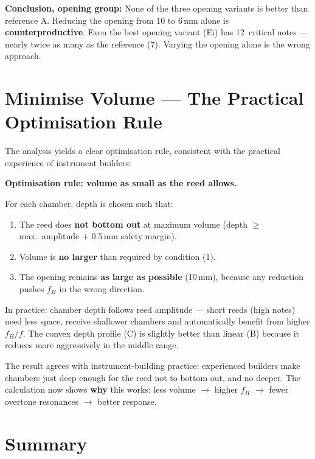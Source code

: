\documentclass[11pt,a4paper]{article}
\begin{document}
\begin{warnbox}
\textbf{Conclusion, opening group:} None of the three opening variants is better than reference A. Reducing the opening from 10 to 6\,mm alone is \textbf{counterproductive}. Even the best opening variant (Ei) has 12~critical notes --- nearly twice as many as the reference (7). Varying the opening alone is the wrong approach.
\end{warnbox}

\section{Minimise Volume --- The Practical Optimisation Rule}

The analysis yields a clear optimisation rule, consistent with the practical experience of instrument builders:

\begin{keybox}
\textbf{Optimisation rule: volume as small as the reed allows.}

For each chamber, depth is chosen such that:
\begin{enumerate}
\item The reed does \textbf{not bottom out} at maximum volume (depth $\geq$ max.\ amplitude $+$ 0.5\,mm safety margin).
\item Volume is \textbf{no larger} than required by condition (1).
\item The opening remains \textbf{as large as possible} (10\,mm), because any reduction pushes $f_H$ in the wrong direction.
\end{enumerate}
\end{keybox}

In practice: chamber depth follows reed amplitude --- short reeds (high notes) need less space, receive shallower chambers and automatically benefit from higher $f_H/f$. The convex depth profile (C) is slightly better than linear (B) because it reduces more aggressively in the middle range.

The result agrees with instrument-building practice: experienced builders make chambers just deep enough for the reed not to bottom out, and no deeper. The calculation now shows \textbf{why} this works: less volume $\to$ higher $f_H$ $\to$ fewer overtone resonances $\to$ better response.

\section{Summary}
\end{document}
